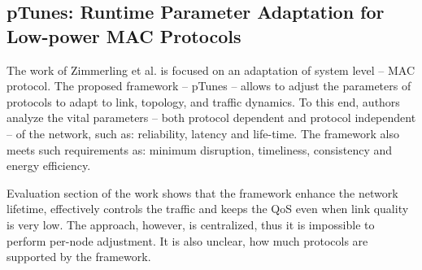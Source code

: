 \subsection{pTunes: Runtime Parameter Adaptation for Low-power MAC Protocols}

The work of Zimmerling et al. is focused on an adaptation of system level -- MAC protocol. The proposed framework -- pTunes -- allows to adjust the parameters of protocols to adapt to link, topology, and traffic dynamics. To this end, authors analyze the vital parameters -- both protocol dependent and protocol independent -- of the network, such as: reliability, latency and life-time. The framework also meets such requirements as: minimum disruption, timeliness, consistency and energy efficiency.

Evaluation section of the work shows that the framework enhance the network lifetime, effectively controls the traffic and keeps the QoS even when link quality is very low. The approach, however, is centralized, thus it is impossible to perform per-node adjustment. It is also unclear, how much protocols are supported by the framework.